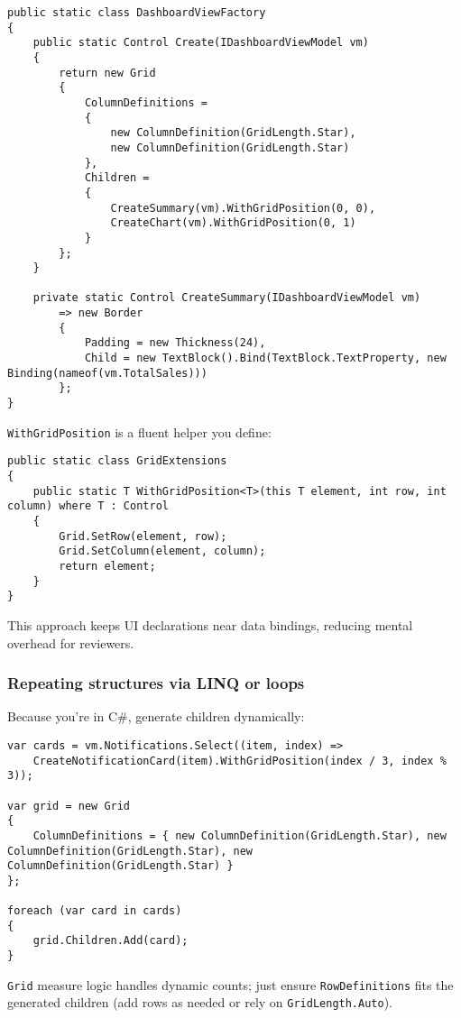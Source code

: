 \begin{lstlisting}
public static class DashboardViewFactory
{
    public static Control Create(IDashboardViewModel vm)
    {
        return new Grid
        {
            ColumnDefinitions =
            {
                new ColumnDefinition(GridLength.Star),
                new ColumnDefinition(GridLength.Star)
            },
            Children =
            {
                CreateSummary(vm).WithGridPosition(0, 0),
                CreateChart(vm).WithGridPosition(0, 1)
            }
        };
    }

    private static Control CreateSummary(IDashboardViewModel vm)
        => new Border
        {
            Padding = new Thickness(24),
            Child = new TextBlock().Bind(TextBlock.TextProperty, new Binding(nameof(vm.TotalSales)))
        };
}
\end{lstlisting}

\passthrough{\lstinline!WithGridPosition!} is a fluent helper you
define:

\begin{lstlisting}
public static class GridExtensions
{
    public static T WithGridPosition<T>(this T element, int row, int column) where T : Control
    {
        Grid.SetRow(element, row);
        Grid.SetColumn(element, column);
        return element;
    }
}
\end{lstlisting}

This approach keeps UI declarations near data bindings, reducing mental
overhead for reviewers.

\subsubsection{Repeating structures via LINQ or
loops}\label{repeating-structures-via-linq-or-loops}

Because you're in C\#, generate children dynamically:

\begin{lstlisting}
var cards = vm.Notifications.Select((item, index) =>
    CreateNotificationCard(item).WithGridPosition(index / 3, index % 3));

var grid = new Grid
{
    ColumnDefinitions = { new ColumnDefinition(GridLength.Star), new ColumnDefinition(GridLength.Star), new ColumnDefinition(GridLength.Star) }
};

foreach (var card in cards)
{
    grid.Children.Add(card);
}
\end{lstlisting}

\passthrough{\lstinline!Grid!} measure logic handles dynamic counts;
just ensure \passthrough{\lstinline!RowDefinitions!} fits the generated
children (add rows as needed or rely on
\passthrough{\lstinline!GridLength.Auto!}).

